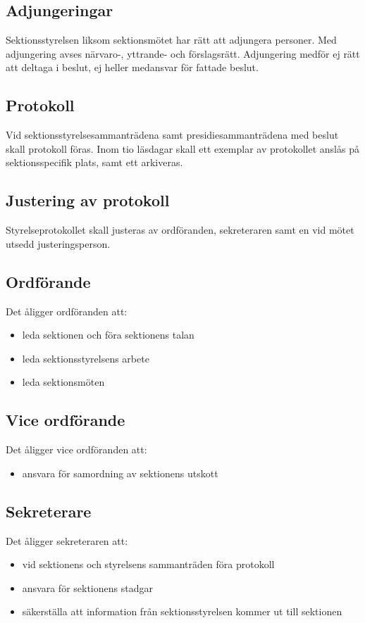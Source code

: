 \documentclass{datateknologsektionen-document}
\begin{document}
\subsection{Adjungeringar}
Sektionsstyrelsen liksom sektionsmötet har rätt att adjungera personer. Med adjungering
avses närvaro-, yttrande- och förslagsrätt. Adjungering medför ej rätt att deltaga i beslut,
ej heller medansvar för fattade beslut.

\subsection{Protokoll}
Vid sektionsstyrelsesammanträdena samt presidiesammanträdena med beslut skall protokoll föras.
Inom tio läsdagar skall ett exemplar av protokollet anslås på sektionsspecifik plats, samt
ett arkiveras.

\subsection{Justering av protokoll}
Styrelseprotokollet skall justeras av ordföranden, sekreteraren samt en vid mötet utsedd
justeringsperson.

\subsection{Ordförande}
Det åligger ordföranden att:
\begin{itemize}
  \item leda sektionen och föra sektionens talan
  \item leda sektionsstyrelsens arbete
  \item leda sektionsmöten
\end{itemize}

\subsection{Vice ordförande}
Det åligger vice ordföranden att:
\begin{itemize}
  \item ansvara för samordning av sektionens utskott
\end{itemize}

\subsection{Sekreterare}
Det åligger sekreteraren att:
\begin{itemize}
  \item vid sektionens och styrelsens sammanträden föra protokoll
  \item ansvara för sektionens stadgar
  \item säkerställa att information från sektionsstyrelsen kommer ut till sektionen
\end{itemize}
\end{document}

